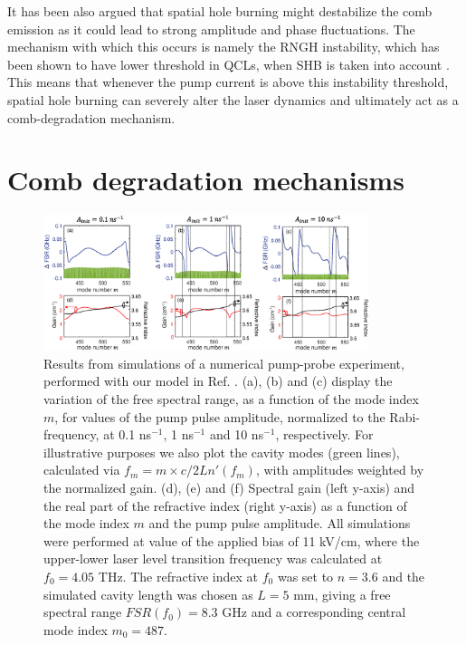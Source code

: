 \documentclass[journal]{IEEEtran}
\begin{document}
	It has been also argued that spatial hole burning might destabilize the comb emission as it could lead to strong amplitude and phase fluctuations. The mechanism with which this occurs is namely the RNGH instability, which has been shown to have lower threshold in QCLs, when SHB is taken into account \cite{gordon2008multimode}. This means that whenever the pump current is above this instability threshold, spatial hole burning can severely alter the laser dynamics and ultimately act as a comb-degradation mechanism.
	
	\section{Comb degradation mechanisms}
	\label{sec:combdegradation}
	
	\begin{figure}[tb]
		\centering
		\includegraphics[width=0.85\textwidth]{IMGS/FSR_variation}
		\caption{Results from simulations of a numerical pump-probe experiment, performed with our model in Ref. \cite{petz2016}. (a), (b) and (c) display the variation of the free spectral range, as a function of the mode index $m$, for values of the pump  pulse amplitude, normalized to the Rabi-frequency, at 0.1 ns$^{-1}$, 1 ns$^{-1}$ and 10 ns$^{-1}$, respectively. For illustrative purposes we also plot the cavity modes (green lines), calculated via $f_m = m\times c/2Ln'(f_m)$, with amplitudes weighted by the normalized gain. (d), (e) and (f) Spectral gain (left y-axis) and the real part of the refractive index (right y-axis) as a function of the mode index $m$ and the pump pulse amplitude. All simulations were performed at value of the applied bias of 11 kV/cm, where the upper-lower laser level transition frequency was calculated at $f_0 = 4.05$ THz. The refractive index at $f_0$ was set to $n=3.6$ and the simulated cavity length was chosen as $L=5$ mm, giving a free spectral range $FSR(f_0) = 8.3$ GHz and a corresponding central mode index $m_0 = 487$.}	\label{fig:dispersion}
	\end{figure}
	
\end{document}
